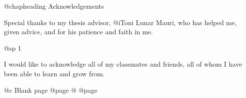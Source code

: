 @chapheading Acknowledgements

Special thanks to my thesis advisor, @i{Toni Lunar Mauri}, who has helped me, given advice, and for his patience and faith in me.

@sp 1

I would like to acknowledge all of my classmates and friends, all of whom I have been able to learn and grow from.

@c Blank page
@page
@
@page
